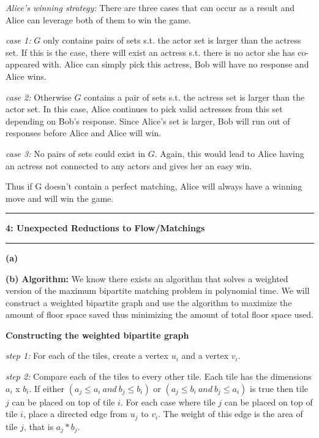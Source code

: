 \documentclass[11pt]{article}
\newcommand\question[2]{\vspace{.25in}\hrule\textbf{#1: #2}\vspace{.5em}\hrule\vspace{.10in}}
\renewcommand\part[1]{\vspace{.10in}\textbf{(#1)}}
\newcommand\algorith{\vspace{.10in}\textbf{Algorithm: }}
\begin{document}
\textit{Alice's winning strategy:} There are three cases that can occur as a result and Alice can leverage both of them to win the game.

\textit{case 1:} $G$ only contains pairs of sets s.t. the actor set is larger than the actress set. If this is the case, there will exist an actress s.t. there is no actor she has co-appeared with. Alice can simply pick this actress, Bob will have no response and Alice wins.

\textit{case 2:} Otherwise $G$ contains a pair of sets s.t. the actress set is larger than the actor set. In this case, Alice continues to pick valid actresses from this set depending on Bob's response. Since Alice's set is larger, Bob will run out of responses before Alice and Alice will win.

\textit{case 3:} No pairs of sets could exist in $G$. Again, this would lead to Alice having an actress not connected to any actors and gives her an easy win.

Thus if G doesn't contain a perfect matching, Alice will always have a winning move and will win the game.

\question{4}{Unexpected Reductions to Flow/Matchings}

\part{a}

\part{b} \algorith We know there exists an algorithm that solves a weighted version of the maximum bipartite matching problem in polynomial time. We will construct a weighted bipartite graph and use the algorithm to maximize the amount of floor space saved thus minimizing the amount of total floor space used.

\textbf{Constructing the weighted bipartite graph}

\textit{step 1:} For each of the tiles, create a vertex $u_i$ and a vertex $v_i$.

\textit{step 2:} Compare each of the tiles to every other tile. Each tile has the dimensions $a_i$ x $b_i$. If either $(a_j \leq a_i \ and \ b_j \leq b_i)$ or $(a_j \leq b_i \ and \ b_j \leq a_i)$ is true then tile $j$ can be placed on top of tile $i$. For each case where tile $j$ can be placed on top of tile $i$, place a directed edge from $u_j$ to $v_i$. The weight of this edge is the area of tile $j$, that is $a_j * b_j$.
\end{document}
